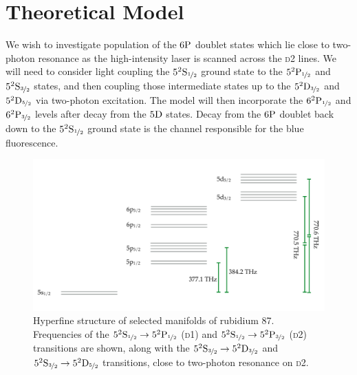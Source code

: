 \section{Theoretical Model}
  \label{sec:twophoton_theory}

    We wish to investigate population of the $6\rm{P}$ doublet states which lie
    close to two-photon resonance as the high-intensity laser is scanned across
    the \textsc{d2} lines. We will need to consider light coupling the
    $5^2\rm{S}_{\nicefrac{1}{2}}$ ground state to the
    $5^2\rm{P}_{\nicefrac{1}{2}}$ and $5^2\rm{S}_{\nicefrac{3}{2}}$ states, and
    then coupling those intermediate states up to the
    $5^2\rm{D}_{\nicefrac{3}{2}}$ and $5^2\rm{D}_{\nicefrac{5}{2}}$ via 
    two-photon excitation. The model will then incorporate the
    $6^2\rm{P}_{\nicefrac{1}{2}}$ and $6^2\rm{P}_{\nicefrac{3}{2}}$ levels after
    decay from the $5\rm{D}$ states. Decay from the $6\rm{P}$ doublet back down
    to the $5^2\rm{S}_{\nicefrac{1}{2}}$ ground state is the channel responsible
    for the blue fluorescence.

    \begin{figure}[]
    \includegraphics[width=\linewidth]
        {figs/05_twophoton/twophoton_level_scheme.pdf}
    \caption{
    Hyperfine structure of selected manifolds of rubidium 87. Frequencies of the
    $5^2\rm{S}_{\nicefrac{1}{2}} \rightarrow 5^2\rm{P}_{\nicefrac{1}{2}}$
    (\textsc{d1}) and $5^2\rm{S}_{\nicefrac{1}{2}} \rightarrow
    5^2\rm{P}_{\nicefrac{3}{2}}$ (\textsc{d2}) transitions are shown, along with
    the $5^2\rm{S}_{\nicefrac{3}{2}} \rightarrow 5^2\rm{D}_{\nicefrac{3}{2}}$
    and  $5^2\rm{S}_{\nicefrac{3}{2}} \rightarrow 5^2\rm{D}_{\nicefrac{5}{2}}$
    transitions, close to two-photon resonance on \textsc{d2}.
    } 
    \label{fig:two_photon_level_scheme} 
    \end{figure}

